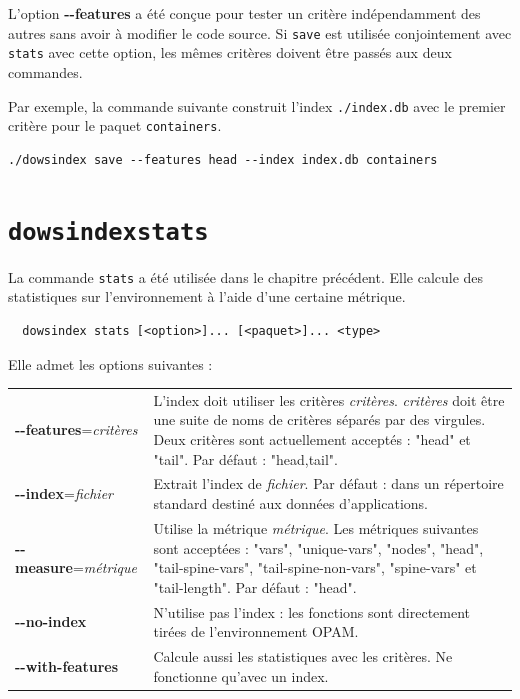 \documentclass[a4paper]{report}
\theoremstyle{definition}
\newcommand{\dowsindex}{\texttt{dowsindex}\xspace}
\begin{document}
{L'option \textbf{-{}-features} a été conçue pour tester un critère indépendamment des autres sans avoir à modifier le code source. Si \texttt{save} est utilisée conjointement avec \texttt{stats} avec cette option, les mêmes critères doivent être passés aux deux commandes.

Par exemple, la commande suivante construit l'index \texttt{./index.db} avec le premier critère pour le paquet \texttt{containers}.

\begin{verbatim}
./dowsindex save --features head --index index.db containers
\end{verbatim}


\section{\dowsindex \texttt{stats}}

La commande \texttt{stats} a été utilisée dans le chapitre précédent. Elle calcule des statistiques sur l'environnement à l'aide d'une certaine métrique.

\begin{center}
  \begin{verbatim}
  dowsindex stats [<option>]... [<paquet>]... <type>
  \end{verbatim}
\end{center}

Elle admet les options suivantes :

\begin{table}[h]
  \begin{tabularx}{\textwidth}{lX}
      \textbf{-{}-features}=\textit{critères} &
      L'index doit utiliser les critères \textit{critères}. \textit{critères} doit être une suite de noms de critères séparés par des virgules. Deux critères sont actuellement acceptés : "head" et "tail". Par défaut : "head,tail".
    \\
      \textbf{-{}-index}=\textit{fichier} &
      Extrait l'index de \textit{fichier}. Par défaut : dans un répertoire standard destiné aux données d'applications.
    \\
      \textbf{-{}-measure}=\textit{métrique} &
      Utilise la métrique \textit{métrique}. Les métriques suivantes sont acceptées : "vars", "unique-vars", "nodes", "head", "tail-spine-vars", "tail-spine-non-vars", "spine-vars" et "tail-length". Par défaut : "head".
    \\
      \textbf{-{}-no-index} &
      N'utilise pas l'index : les fonctions sont directement tirées de l'environnement OPAM.
    \\
      \textbf{-{}-with-features} &
      Calcule aussi les statistiques avec les critères. Ne fonctionne qu'avec un index.
  \end{tabularx}
\end{table}

}
\end{document}
